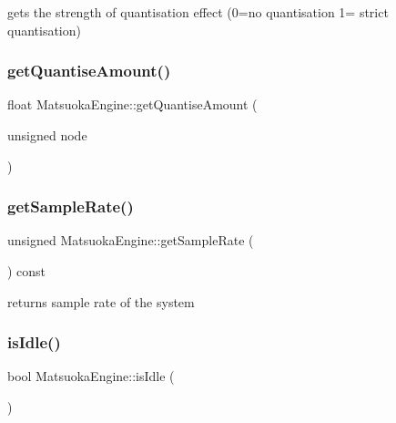 gets the strength of quantisation effect (0=no quantisation 1= strict quantisation) 

\mbox{\label{classMatsuokaEngine_a8150c0efacb8f3d5ec2c3fb5731dfc97}} 
\subsubsection{\texorpdfstring{get\+Quantise\+Amount()}{getQuantiseAmount()}\hspace{0.1cm}{\footnotesize\ttfamily [2/2]}}
{\footnotesize\ttfamily float Matsuoka\+Engine\+::get\+Quantise\+Amount (\begin{DoxyParamCaption}\item[{unsigned}]{node }\end{DoxyParamCaption})}

\mbox{\label{classMatsuokaEngine_a2757e406e811cbe2e28f8b661cf29472}} 
\subsubsection{\texorpdfstring{get\+Sample\+Rate()}{getSampleRate()}}
{\footnotesize\ttfamily unsigned Matsuoka\+Engine\+::get\+Sample\+Rate (\begin{DoxyParamCaption}{ }\end{DoxyParamCaption}) const}



returns sample rate of the system 

\mbox{\label{classMatsuokaEngine_a1b6e6f86762e4541854b4262eb217f7e}} 
\subsubsection{\texorpdfstring{is\+Idle()}{isIdle()}}
{\footnotesize\ttfamily bool Matsuoka\+Engine\+::is\+Idle (\begin{DoxyParamCaption}{ }\end{DoxyParamCaption})}



